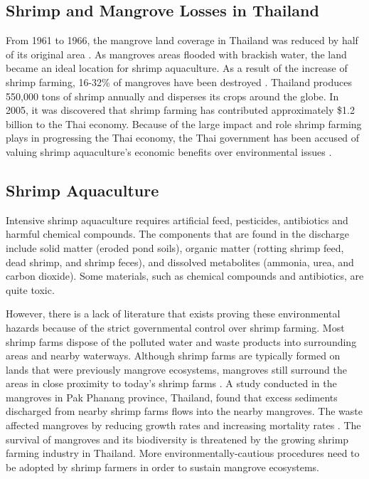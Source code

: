 \subsection{Shrimp and Mangrove Losses in Thailand}

From 1961 to 1966, the mangrove land coverage in Thailand was reduced by half of its original area \citep{naito2014relationship}.  As mangroves areas flooded with brackish water, the land became an ideal location for shrimp aquaculture. As a result of the increase of shrimp farming, 16-32\% of mangroves have been destroyed \citep{chambers2011aquaculture}. Thailand produces 550,000 tons of shrimp annually and disperses its crops around the globe. In 2005, it was discovered that shrimp farming has contributed approximately \$1.2 billion to the Thai economy. Because of the large impact and role shrimp farming plays in progressing the Thai economy, the Thai government has been accused of valuing shrimp aquaculture's economic benefits over environmental issues \citep{trisurat2006community}. 

\subsection{Shrimp Aquaculture}

Intensive shrimp aquaculture requires artificial feed, pesticides, antibiotics and harmful chemical compounds. The components that are found in the discharge include solid matter (eroded pond soils), organic matter (rotting shrimp feed, dead shrimp, and shrimp feces), and dissolved metabolites (ammonia, urea, and carbon dioxide). Some materials, such as chemical compounds and antibiotics, are quite toxic. 

However, there is a lack of literature that exists proving these environmental hazards because of the strict governmental control over shrimp farming. Most shrimp farms dispose of the polluted water and waste products into surrounding areas and nearby waterways. Although shrimp farms are typically formed on lands that were previously mangrove ecosystems, mangroves still surround the areas in close proximity to today's shrimp farms \citep{aksornkoae2004overview}. A study conducted in the mangroves in Pak Phanang province, Thailand, found  that excess sediments discharged from nearby shrimp farms flows into the nearby mangroves. The waste affected mangroves by reducing growth rates and increasing mortality rates \citep{vaiphasa2007impact}. The survival of mangroves and its biodiversity is threatened by the growing shrimp farming industry in Thailand. More environmentally-cautious procedures need to be adopted by shrimp farmers in order to sustain mangrove ecosystems. 

